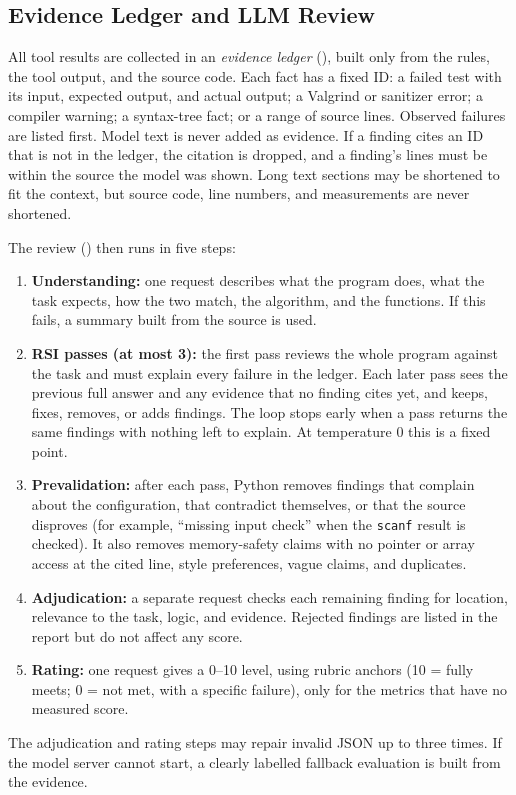 \documentclass[conference]{IEEEtran}
\begin{document}
\subsection{Evidence Ledger and LLM Review}
All tool results are collected in an \emph{evidence ledger}
(), built only from the rules, the tool output, and the source
code. Each fact has a fixed ID: a failed test with its input, expected output,
and actual output; a Valgrind or sanitizer error; a compiler warning; a
syntax-tree fact; or a range of source lines. Observed failures are listed
first. Model text is never added as evidence. If a finding cites an ID that is
not in the ledger, the citation is dropped, and a finding's lines must be within
the source the model was shown. Long text sections may be shortened to fit the
context, but source code, line numbers, and measurements are never shortened.

The review () then runs in five steps:
\begin{enumerate}
  \item \textbf{Understanding:} one request describes what the program does,
        what the task expects, how the two match, the algorithm, and the
        functions. If this fails, a summary built from the source is used.
  \item \textbf{RSI passes (at most 3):} the first pass reviews the whole
        program against the task and must explain every failure in the ledger.
        Each later pass sees the previous full answer and any evidence that no
        finding cites yet, and keeps, fixes, removes, or adds findings. The loop
        stops early when a pass returns the same findings with nothing left to
        explain. At temperature 0 this is a fixed point.
  \item \textbf{Prevalidation:} after each pass, Python removes findings that
        complain about the configuration, that contradict themselves, or that
        the source disproves (for example, ``missing input check'' when the
        \texttt{scanf} result is checked). It also removes memory-safety claims
        with no pointer or array access at the cited line, style preferences,
        vague claims, and duplicates.
  \item \textbf{Adjudication:} a separate request checks each remaining finding
        for location, relevance to the task, logic, and evidence. Rejected
        findings are listed in the report but do not affect any score.
  \item \textbf{Rating:} one request gives a 0--10 level, using rubric anchors
        (10 = fully meets; 0 = not met, with a specific failure), only for the
        metrics that have no measured score.
\end{enumerate}
The adjudication and rating steps may repair invalid JSON up to three times. If
the model server cannot start, a clearly labelled fallback evaluation is built
from the evidence.
\end{document}

